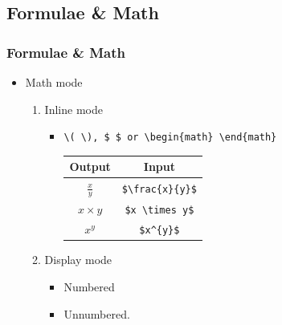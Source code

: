 \documentclass[12pt]{beamer}
\begin{document}
\begin{frame}[fragile]
\section{Formulae \& Math         }
\frametitle{Formulae \& Math }
\begin{itemize}\justifying
	\item Math mode 
	\begin{enumerate}
		\item Inline mode
		\begin{itemize}
			\item \verb|\( \), $ $ or \begin{math} \end{math}|
			\renewcommand{\arraystretch}{2}
			\begin{tabular}{|c|c|}
				\hline
				\textbf{Output} &\textbf{Input}\\ \hline
				$\frac{x}{y}$ &\verb|$\frac{x}{y}$|\\ \hline
				$x \times y$ &\verb|$x \times y$|\\ \hline
				$x^{y}$ &\verb|$x^{y}$|\\ \hline		
			\end{tabular}
		\end{itemize}
		\item Display mode
		\begin{itemize}
			\item Numbered 
			\item Unnumbered. 
		\end{itemize}
	\end{enumerate}
\end{itemize}
\end{frame}
\end{document}
